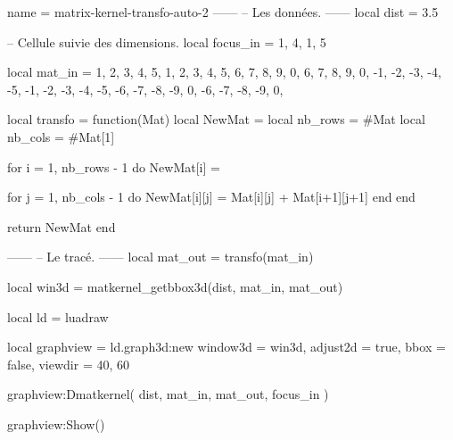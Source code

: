 \documentclass[border = 3pt]{standalone}
\begin{document}
\begin{luadraw*}{name = matrix-kernel-transfo-auto-2}
------
-- Les données.
------
local dist = 3.5

-- Cellule suivie des dimensions.
local focus_in = { {1, 4}, {1, 5} }

local mat_in = {
  { 1,  2,  3,  4,  5,  1,  2,  3,  4,  5},
  { 6,  7,  8,  9,  0,  6,  7,  8,  9,  0},
  {-1, -2, -3, -4, -5, -1, -2, -3, -4, -5},
  {-6, -7, -8, -9,  0, -6, -7, -8, -9,  0},
}

local transfo = function(Mat)
  local NewMat  = {}
  local nb_rows = #Mat
  local nb_cols = #Mat[1]

  for i = 1, nb_rows - 1 do
    NewMat[i] = {}

    for j = 1, nb_cols - 1 do
      NewMat[i][j] = Mat[i][j] + Mat[i+1][j+1]
    end
  end

  return NewMat
end

------
-- Le tracé.
------
local mat_out = transfo(mat_in)

local win3d = matkernel_getbbox3d(dist, mat_in, mat_out)

local ld = luadraw

local graphview = ld.graph3d:new{
  window3d = win3d,
  adjust2d = true,
  bbox     = false,
  viewdir  = {40, 60}
}

graphview:Dmatkernel(
  dist,
  mat_in, mat_out,
  focus_in
)

graphview:Show()
\end{luadraw*}
\end{document}
